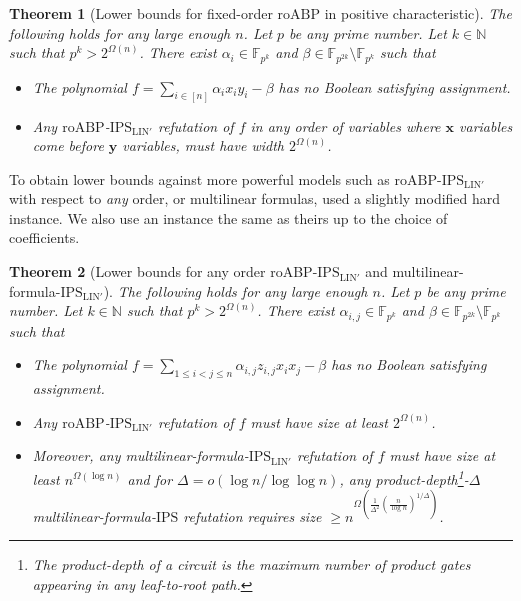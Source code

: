 \documentclass[11pt]{article}
\newtheorem{theorem}{Theorem}[section]
\newcommand{\F}{\mathbb{F}}
\newcommand{\IPS}{\mathrm{IPS}}
\newcommand{\IPSLINp}{\mathrm{IPS}_{\mathrm{LIN}'}}
\newcommand{\roABP}{\mathrm{roABP}}
\begin{document}
\begin{theorem}[Lower bounds for fixed-order $\roABP$ in positive characteristic]
    \label{thm:lbd-fixed-order-roabp}
    The following holds for any large enough $n$. Let $p$ be any prime number. Let $k \in \mathbb{N}$ such that $p^k > 2^{\Omega(n)}$.  There exist $\alpha_{i}\in \F_{p^k}$ and $\beta \in \F_{p^{2k}}\setminus \F_{p^k}$ such that 
    \begin{itemize}
        \item The polynomial $f = \sum_{i \in [n]}\alpha_{i} x_i y_i - \beta$ has no Boolean satisfying assignment.
        \item Any $\roABP$-$\IPSLINp$ refutation of $f$ in any order of variables where $\mathbf{x}$ variables come before $\mathbf{y}$ variables, must have width $2^{\Omega(n)}$. 
    \end{itemize}
\end{theorem}

To obtain lower bounds against more powerful models such as $\roABP$-$\IPSLINp$ with respect to \emph{any} order, or multilinear formulas, \cite{FSTW21} used a slightly modified hard instance. We also use an instance the same as theirs up to the choice of coefficients. 

\begin{theorem}
[Lower bounds for any order roABP-$\IPSLINp$ and multilinear-formula-$\IPSLINp$]
    \label{thm:lbd-roabp}
    The following holds for any large enough $n$. Let $p$ be any prime number. Let $k \in \mathbb{N}$ such that $p^k > 2^{\Omega(n)}$. There exist $\alpha_{i,j}\in \F_{p^k}$ and $\beta \in \F_{p^{2k}}\setminus \F_{p^k}$ such that 
    \begin{itemize}
        \item The polynomial $f = \sum_{1\leq i < j\leq n}\alpha_{i,j} z_{i,j} x_i x_j - \beta$ has no Boolean satisfying assignment.
        \item Any $\roABP$-$\IPSLINp$ refutation of $f$ must have size at least $2^{\Omega(n)}$.
        \item Moreover, any multilinear-formula-$\IPSLINp$ refutation of $f$ must have size at least $n^{\Omega(\log n)}$ and for $\Delta = o(\log n / \log \log n)$, any product-depth\footnote{The product-depth of a circuit is the maximum number of product gates appearing in any leaf-to-root path.}-$\Delta$ multilinear-formula-$\IPS$ refutation requires size $\geq n^{\Omega\left(\frac{1}{\Delta^2}(\frac{n}{\log n})^{1/\Delta}\right )}$. 
\end{itemize}
\end{theorem}
\end{document}
